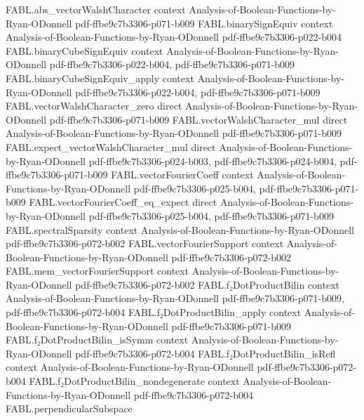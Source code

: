 \begin{theorem}
\proofstep
  {FABL.abs_vectorWalshCharacter}
  {context}
  {Analysis-of-Boolean-Functions-by-Ryan-ODonnell}
  {pdf-ffbe9c7b3306-p071-b009}
\proofstep
  {FABL.binarySignEquiv}
  {context}
  {Analysis-of-Boolean-Functions-by-Ryan-ODonnell}
  {pdf-ffbe9c7b3306-p022-b004}
\proofstep
  {FABL.binaryCubeSignEquiv}
  {context}
  {Analysis-of-Boolean-Functions-by-Ryan-ODonnell}
  {pdf-ffbe9c7b3306-p022-b004,
    pdf-ffbe9c7b3306-p071-b009}
\proofstep
  {FABL.binaryCubeSignEquiv_apply}
  {context}
  {Analysis-of-Boolean-Functions-by-Ryan-ODonnell}
  {pdf-ffbe9c7b3306-p022-b004,
    pdf-ffbe9c7b3306-p071-b009}
\proofstep
  {FABL.vectorWalshCharacter_zero}
  {direct}
  {Analysis-of-Boolean-Functions-by-Ryan-ODonnell}
  {pdf-ffbe9c7b3306-p071-b009}
\proofstep
  {FABL.vectorWalshCharacter_mul}
  {direct}
  {Analysis-of-Boolean-Functions-by-Ryan-ODonnell}
  {pdf-ffbe9c7b3306-p071-b009}
\proofstep
  {FABL.expect_vectorWalshCharacter_mul}
  {direct}
  {Analysis-of-Boolean-Functions-by-Ryan-ODonnell}
  {pdf-ffbe9c7b3306-p024-b003,
    pdf-ffbe9c7b3306-p024-b004,
    pdf-ffbe9c7b3306-p071-b009}
\proofstep
  {FABL.vectorFourierCoeff}
  {context}
  {Analysis-of-Boolean-Functions-by-Ryan-ODonnell}
  {pdf-ffbe9c7b3306-p025-b004,
    pdf-ffbe9c7b3306-p071-b009}
\proofstep
  {FABL.vectorFourierCoeff_eq_expect}
  {direct}
  {Analysis-of-Boolean-Functions-by-Ryan-ODonnell}
  {pdf-ffbe9c7b3306-p025-b004,
    pdf-ffbe9c7b3306-p071-b009}
\proofstep
  {FABL.spectralSparsity}
  {context}
  {Analysis-of-Boolean-Functions-by-Ryan-ODonnell}
  {pdf-ffbe9c7b3306-p072-b002}
\proofstep
  {FABL.vectorFourierSupport}
  {context}
  {Analysis-of-Boolean-Functions-by-Ryan-ODonnell}
  {pdf-ffbe9c7b3306-p072-b002}
\proofstep
  {FABL.mem_vectorFourierSupport}
  {context}
  {Analysis-of-Boolean-Functions-by-Ryan-ODonnell}
  {pdf-ffbe9c7b3306-p072-b002}
\proofstep
  {FABL.f₂DotProductBilin}
  {context}
  {Analysis-of-Boolean-Functions-by-Ryan-ODonnell}
  {pdf-ffbe9c7b3306-p071-b009,
    pdf-ffbe9c7b3306-p072-b004}
\proofstep
  {FABL.f₂DotProductBilin_apply}
  {context}
  {Analysis-of-Boolean-Functions-by-Ryan-ODonnell}
  {pdf-ffbe9c7b3306-p071-b009}
\proofstep
  {FABL.f₂DotProductBilin_isSymm}
  {context}
  {Analysis-of-Boolean-Functions-by-Ryan-ODonnell}
  {pdf-ffbe9c7b3306-p072-b004}
\proofstep
  {FABL.f₂DotProductBilin_isRefl}
  {context}
  {Analysis-of-Boolean-Functions-by-Ryan-ODonnell}
  {pdf-ffbe9c7b3306-p072-b004}
\proofstep
  {FABL.f₂DotProductBilin_nondegenerate}
  {context}
  {Analysis-of-Boolean-Functions-by-Ryan-ODonnell}
  {pdf-ffbe9c7b3306-p072-b004}
\proofstep
  {FABL.perpendicularSubspace}

\end{theorem}
